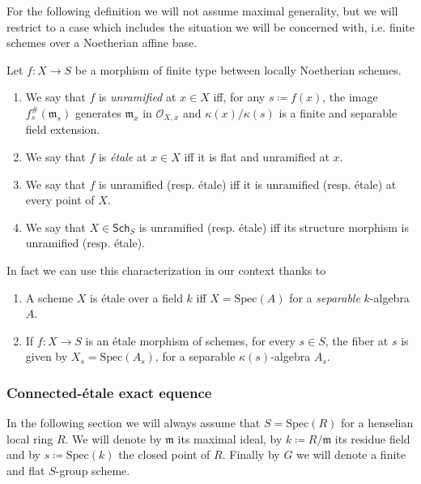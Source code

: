 \documentclass[../Main]{subfiles}
\begin{document}
For the following definition we will not assume maximal generality, but
we will restrict to a case which includes the situation we will be concerned with,
i.e. finite schemes over a Noetherian affine base.
\begin{defn}\label{defn:EtaleMorphismSheaves}
	Let $f\colon X \to S$ be a morphism of finite type between
	locally Noetherian schemes.
\begin{enumerate}
	\item We say that $f$ is {\em unramified} at $x \in X$ iff, for any $s \coloneqq f(x)$,
		the image $f^{\#}_s(\mathfrak{m}_s)$ generates
		$\mathfrak{m}_x$ in $\mathcal{O}_{ X,x }$
		and $\kappa(x)/\kappa(s)$ is a finite and separable field extension.

	\item We say that $f$ is {\em étale} at $x \in X$ iff it is
		flat and unramified at $x$.

	\item We say that $f$ is unramified (resp$.$ étale) iff it is 
		unramified (resp$.$ étale) at every point of $X$.

	\item We say that $X \in \mathsf{Sch}_{ S }$ is unramified 
		(resp$.$ étale) iff its structure
		morphism is unramified (resp$.$ étale).
\end{enumerate}
\end{defn}


In fact we can use this characterization in our context thanks to
\begin{lem}
	\leavevmode\vspace{-.2\baselineskip}
\begin{enumerate}
	\item A scheme $X$ is étale over a field $k$ iff $X = \mathrm{Spec}(A)$
		for a {\em separable} $k$-algebra $A$.
	\item If $f\colon X \to S$ is an étale morphism of schemes,
		for every $s \in S$, the fiber at $s$ is given by $X_s = \mathrm{Spec}(A_s)$,
		for a separable $\kappa(s)$-algebra $A_s$.
\end{enumerate}
\end{lem} 

\subsubsection{Connected-étale exact equence}
In the following section we will always assume that 
$S = \mathrm{Spec}(R)$	for a henselian local ring $R$.
We will denote by $\mathfrak{m}$ its maximal ideal, by $k \coloneqq R/\mathfrak{m}$
its residue field and by $s \coloneqq \mathrm{Spec}(k)$ the closed point of $R$.
Finally by $G$ we will denote a finite and flat $S$-group scheme.
\end{document}
